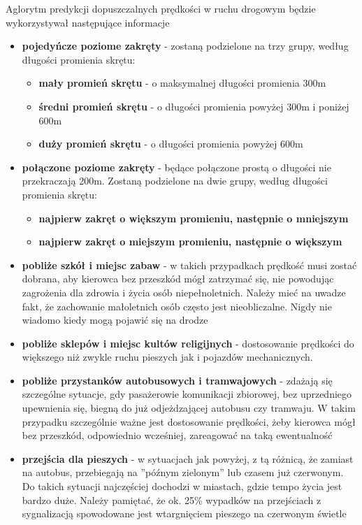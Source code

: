Aglorytm predykcji dopuszczalnych prędkości w ruchu drogowym będzie wykorzystywał następujące informacje

\begin{itemize}
\item \textbf{pojedyńcze poziome zakręty} - zostaną podzielone na trzy grupy, według długości promienia skrętu:
 \begin{itemize}
 	\item \textbf{mały promień skrętu} - o maksymalnej długości promienia 300m
 	\item \textbf{średni promień skrętu} - o długości promienia powyżej 300m i poniżej 600m
 	\item \textbf{duży promień skrętu} - o długości promienia powyżej 600m 
 \end{itemize}
\item \textbf{połączone poziome zakręty} - będące połączone prostą o długości nie przekraczają 200m. Zostaną podzielone na dwie grupy, według długości promienia skrętu:
 \begin{itemize}
 	\item \textbf{najpierw zakręt o większym promieniu, następnie o mniejszym}
 	\item \textbf{najpierw zakręt o miejszym promieniu, następnie o większym}
 \end{itemize}
\item \textbf{pobliże szkół i miejsc zabaw} - w takich przypadkach prędkość musi zostać dobrana, aby kierowca bez przeszkód mógł zatrzymać się, nie powodując zagrożenia dla zdrowia i życia osób niepełnoletnich. Należy mieć na uwadze fakt, że zachowanie małoletnich osób często jest nieobliczalne. Nigdy nie wiadomo kiedy mogą pojawić się na drodze
\item \textbf{pobliże sklepów i miejsc kultów religijnych} - dostosowanie prędkości do większego niż zwykle ruchu pieszych jak i pojazdów mechanicznych.
\item \textbf{pobliże przystanków autobusowych i tramwajowych} - zdażają się szczególne sytuacje, gdy pasażerowie komunikacji zbiorowej, bez uprzedniego upewnienia się, biegną  do już odjeżdzającej autobusu czy tramwaju. W takim przypadku szczególnie ważne jest dostosowanie prędkości, żeby kierowca mógł bez przeszkód, odpowiednio wcześniej, zareagować na taką ewentualność
\newpage
\item \textbf{przejścia dla pieszych} - w sytuacjach jak powyżej, z tą różnicą, że zamiast na autobus, przebiegają na ''późnym zielonym'' lub czasem już czerwonym. Do takich sytuacji najczęściej dochodzi w miastach, gdzie tempo życia jest bardzo duże. Należy pamiętać, że ok. 25\% wypadków na przejściach z sygnalizacją spowodowane jest wtargnięciem pieszego na czerwonym świetle

\end{itemize}
